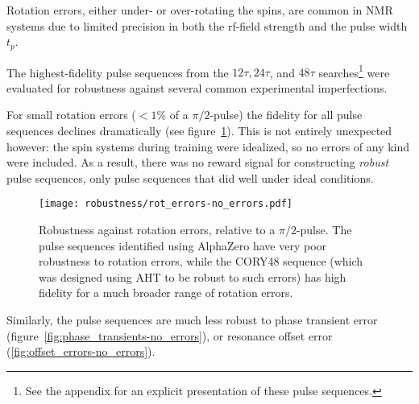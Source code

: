 








Rotation errors, either under- or over-rotating the spins, are common in NMR systems due to limited precision in both the rf-field strength and the pulse width $t_p$.





The highest-fidelity pulse sequences from the $12\tau, 24\tau$, and $48\tau$ searches\footnote{
See the appendix for an explicit presentation of these pulse sequences.
} were evaluated for robustness against several common experimental imperfections.



For small rotation errors ($<1\%$ of a $\pi/2$-pulse) the fidelity for all pulse sequences declines dramatically (see figure~\ref{fig:rot_errors-no_errors}).
This is not entirely unexpected however: the spin systems during training were idealized, so no errors of any kind were included. As a result, there was no reward signal for constructing \emph{robust} pulse sequences, only pulse sequences that did well under ideal conditions.





\begin{figure}[H]
    \centering
    \texttt{[image: robustness/rot\_errors-no\_errors.pdf]}
    \caption{Robustness against rotation errors, relative to a $\pi/2$-pulse. The pulse sequences identified using AlphaZero have very poor robustness to rotation errors, while the CORY48 sequence (which was designed using AHT to be robust to such errors) has high fidelity for a much broader range of rotation errors.
    }
    \label{fig:rot_errors-no_errors}
\end{figure}

Similarly, the pulse sequences are much less robust to phase transient error (figure~\ref{fig:phase_transients-no_errors}), or
resonance offset error (\ref{fig:offset_errors-no_errors}).


